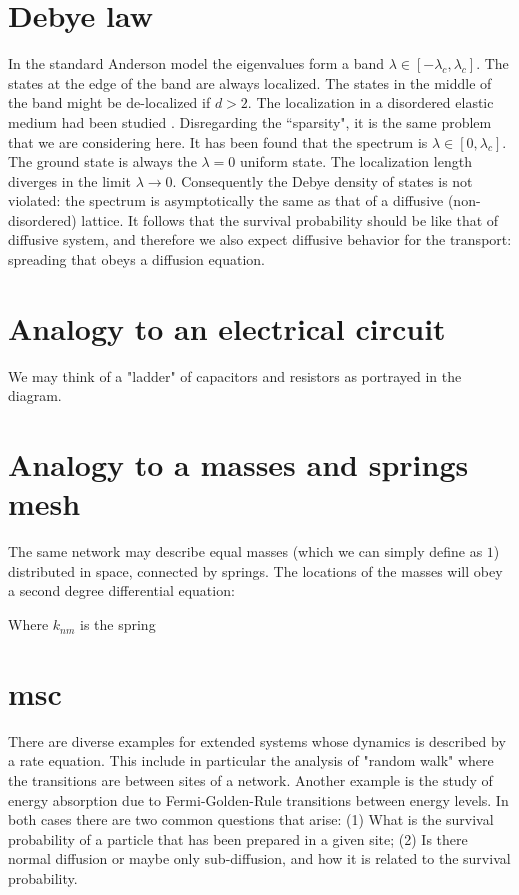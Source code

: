 \section{Debye law}
In the standard Anderson model the eigenvalues form 
a band ${\lambda \in [-\lambda_c,\lambda_c]}$.
The states at the edge of the band are always localized.
The states in the middle of the band might be de-localized if ${d>2}$.  
%
The localization in a disordered elastic medium had been 
studied \cite{loc}. Disregarding the ``sparsity",  
it is the same problem that we are considering here.
It has been found that the spectrum is ${\lambda \in [0,\lambda_c]}$.
The ground state is always the ${\lambda=0}$ uniform state.
The localization length diverges in the limit ${\lambda \rightarrow 0}$.
Consequently the Debye density of states is not violated:
the spectrum is asymptotically the same as that of a 
diffusive (non-disordered) lattice. It follows that the 
survival probability should be like that of diffusive 
system, and therefore we also expect diffusive behavior
for the transport: spreading that obeys a diffusion equation.


\section{Analogy to an electrical circuit}

We may think of a "ladder" of capacitors and resistors as portrayed in the diagram.



\section{Analogy to a masses and springs mesh} 

The same network may describe equal masses (which 
we can simply define as $1$) distributed in space,
connected by springs. The locations of the masses will
obey a second degree differential equation:

%
%
Where $k_{nm}$ is the spring 


\section{msc}

There are diverse examples for extended systems whose dynamics is described by a rate equation. This include in particular the analysis of "random walk" where the transitions are between sites of a network. Another example is the study of energy absorption due to Fermi-Golden-Rule transitions between energy levels. In both cases there are two common questions that arise: (1) What is the survival probability of a particle  that has been prepared in a given site; (2) Is there normal diffusion or maybe only sub-diffusion, and how it is related to the survival probability.

